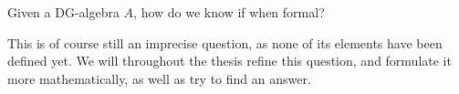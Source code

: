 \begin{central}
Given a DG-algebra $A$, how do we know if  when formal?
\end{central}

This is of course still an imprecise question, as none of its elements have been defined yet. We will throughout the thesis refine this question, and formulate it more mathematically, as well as try to find an answer. 


















